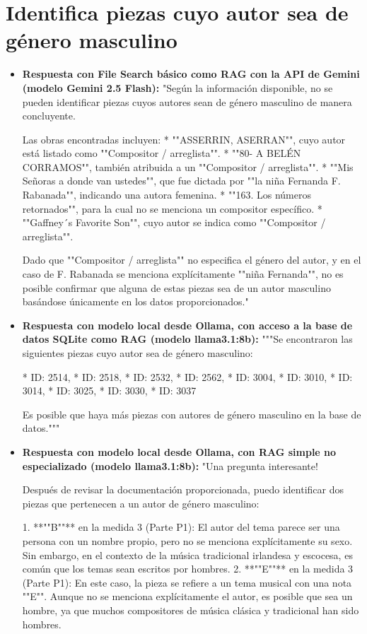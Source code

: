 \section{Identifica piezas cuyo autor sea de género masculino}
\begin{itemize}
    \item \textbf{Respuesta con File Search básico como RAG con la API de Gemini (modelo Gemini 2.5 Flash):} "Según la información disponible, no se pueden identificar piezas cuyos autores sean de género masculino de manera concluyente.

Las obras encontradas incluyen:
*   ""ASSERRIN, ASERRAN"", cuyo autor está listado como ""Compositor / arreglista"".
*   ""80- A BELÉN CORRAMOS"", también atribuida a un ""Compositor / arreglista"".
*   ""Mis Señoras a donde van ustedes"", que fue dictada por ""la niña Fernanda F. Rabanada"", indicando una autora femenina.
*   ""163. Los números retornados"", para la cual no se menciona un compositor específico.
*   ""Gaffney´s Favorite Son"", cuyo autor se indica como ""Compositor / arreglista"".

Dado que ""Compositor / arreglista"" no especifica el género del autor, y en el caso de F. Rabanada se menciona explícitamente ""niña Fernanda"", no es posible confirmar que alguna de estas piezas sea de un autor masculino basándose únicamente en los datos proporcionados."
    \item \textbf{Respuesta con modelo local desde Ollama, con acceso a la base de datos SQLite como RAG (modelo llama3.1:8b):} """Se encontraron las siguientes piezas cuyo autor sea de género masculino:

* ID: 2514,
* ID: 2518,
* ID: 2532,
* ID: 2562,
* ID: 3004,
* ID: 3010,
* ID: 3014,
* ID: 3025,
* ID: 3030,
* ID: 3037

Es posible que haya más piezas con autores de género masculino en la base de datos."""
\item \textbf{Respuesta con modelo local desde Ollama, con RAG simple no especializado (modelo llama3.1:8b):} "Una pregunta interesante!

Después de revisar la documentación proporcionada, puedo identificar dos piezas que pertenecen a un autor de género masculino:

1. **""B""** en la medida 3 (Parte P1): El autor del tema parece ser una persona con un nombre propio, pero no se menciona explícitamente su sexo. Sin embargo, en el contexto de la música tradicional irlandesa y escocesa, es común que los temas sean escritos por hombres.
2. **""E""** en la medida 3 (Parte P1): En este caso, la pieza se refiere a un tema musical con una nota ""E"". Aunque no se menciona explícitamente el autor, es posible que sea un hombre, ya que muchos compositores de música clásica y tradicional han sido hombres.


\end{itemize}
